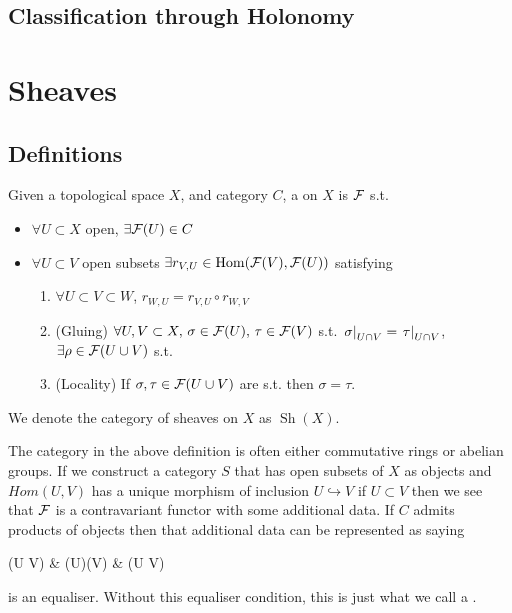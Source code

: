 \documentclass{article}
\begin{document}
\subsection{Classification through Holonomy}

\section{Sheaves}
\subsection{Definitions}

\begin{definition}
	Given a topological space $X$, and category $C$, a  on $X$ is $\mathcal{F}$ s.t. 
	\begin{itemize}
		\item $\forall U \subset X$ open, $\exists \mathcal{F}(U) \in C$
		\item $\forall U \subset V$ open subsets $\exists r_{V,U} \in \operatorname{Hom}(\mathcal{F}(V), \mathcal{F}(U))$ satisfying
		\begin{enumerate}
			\item $\forall U \subset V \subset W$, $r_{W,U} = r_{V,U} \circ r_{W,V}$
			\item (Gluing) $\forall U,V \subset X, \, \sigma \in \mathcal{F}(U), \, \tau \in \mathcal{F}(V)$ s.t. $\left. \sigma \right\rvert_{U \cap V} = \left. \tau \right\rvert_{U \cap V}$, $\exists \rho \in \mathcal{F}(U \cup V)$ s.t. 
			\item (Locality) If $\sigma, \tau \in \mathcal{F}(U \cup V)$ are s.t. 
			then $\sigma = \tau$.
		\end{enumerate}
	\end{itemize}
We denote the category of sheaves on $X$ as $\operatorname{Sh}(X)$. 
\end{definition}

\begin{remark}
	The category in the above definition is often either commutative rings or abelian groups. If we construct a category $S$ that has open subsets of $X$ as objects and $Hom(U,V)$ has a unique morphism of inclusion $U \hookrightarrow V$ if $U \subset V$ then we see that $\mathcal{F}$ is a contravariant functor with some additional data. If $C$ admits products of objects then that additional data can be represented as saying 
	\begin{tkz}
		(U \cup V) \arrow[r] &  (U)\times {}(V)   & (U \cap V) 
	\end{tkz}
	is an equaliser. Without this equaliser condition, this is just what we call a . 
\end{remark}
\end{document}
